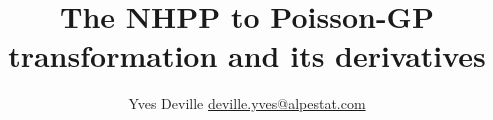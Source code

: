 \documentclass[11pt]{article}
\title{The NHPP to Poisson-GP transformation and its derivatives}
\author{Yves Deville \href{mailto:deville.yves@alpestat.com}%
  {deville.yves@alpestat.com} }
\begin{document}
\maketitle{}
\tableofcontents{}

\end{document}

